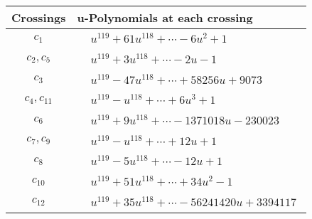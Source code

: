 \documentclass[1p]{elsarticle_modified}
\theoremstyle{definition}
\begin{document}
\begin{tabular}{m{50pt}|m{274pt}}
Crossings & \hspace{64pt}u-Polynomials at each crossing \\
\hline $$\begin{aligned}c_{1}\end{aligned}$$&$\begin{aligned}
&u^{119}+61 u^{118}+\cdots-6 u^2+1
\end{aligned}$\\
\hline $$\begin{aligned}c_{2},c_{5}\end{aligned}$$&$\begin{aligned}
&u^{119}+3 u^{118}+\cdots-2 u-1
\end{aligned}$\\
\hline $$\begin{aligned}c_{3}\end{aligned}$$&$\begin{aligned}
&u^{119}-47 u^{118}+\cdots+58256 u+9073
\end{aligned}$\\
\hline $$\begin{aligned}c_{4},c_{11}\end{aligned}$$&$\begin{aligned}
&u^{119}- u^{118}+\cdots+6 u^3+1
\end{aligned}$\\
\hline $$\begin{aligned}c_{6}\end{aligned}$$&$\begin{aligned}
&u^{119}+9 u^{118}+\cdots-1371018 u-230023
\end{aligned}$\\
\hline $$\begin{aligned}c_{7},c_{9}\end{aligned}$$&$\begin{aligned}
&u^{119}- u^{118}+\cdots+12 u+1
\end{aligned}$\\
\hline $$\begin{aligned}c_{8}\end{aligned}$$&$\begin{aligned}
&u^{119}-5 u^{118}+\cdots-12 u+1
\end{aligned}$\\
\hline $$\begin{aligned}c_{10}\end{aligned}$$&$\begin{aligned}
&u^{119}+51 u^{118}+\cdots+34 u^2-1
\end{aligned}$\\
\hline $$\begin{aligned}c_{12}\end{aligned}$$&$\begin{aligned}
&u^{119}+35 u^{118}+\cdots-56241420 u+3394117
\end{aligned}$\\
\hline
\end{tabular}\newpage\renewcommand{\arraystretch}{1}
\end{document}
